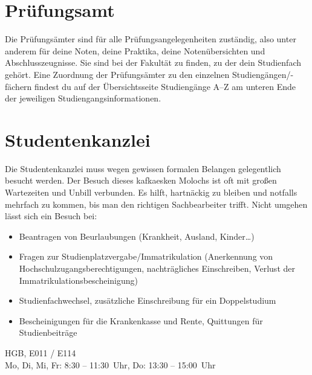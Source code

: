 \section{Prüfungsamt}
Die Prüfungsämter sind für alle Prüfungsangelegenheiten zuständig,
also unter anderem für deine Noten, deine Praktika, deine Notenübersichten und
Abschlusszeugnisse. Sie sind bei der Fakultät zu finden, zu der
dein Studienfach gehört. Eine Zuordnung der Prüfungsämter zu den
einzelnen Studiengängen/-fächern findest du auf der Übersichtsseite
Studiengänge A--Z am unteren Ende der jeweiligen
Studiengangsinformationen.

\begin{urlList}
\end{urlList}

\section{Studentenkanzlei}

Die Studentenkanzlei muss wegen gewissen formalen Belangen
gelegentlich besucht werden. Der Besuch dieses kafkaesken Molochs ist
oft mit großen Wartezeiten und Unbill verbunden. Es hilft, hartnäckig
zu bleiben und notfalls mehrfach zu kommen, bis man den richtigen
Sachbearbeiter trifft. Nicht umgehen lässt sich ein Besuch bei:

\begin{itemize}
\item Beantragen von Beurlaubungen (Krankheit, Ausland, Kinder\ldots)
\item Fragen zur Studienplatzvergabe/Immatrikulation (Anerkennung von Hochschulzugangsberechtigungen, nachträgliches Einschreiben, Verlust der Immatrikulationsbescheinigung)
\item Studienfachwechsel, zusätzliche Einschreibung für ein Doppelstudium
\item Bescheinigungen für die Krankenkasse und Rente, Quittungen für Studienbeiträge
\end{itemize}

HGB, E011 / E114\\
Mo, Di, Mi, Fr: 8:30 -- 11:30~Uhr, Do: 13:30 -- 15:00~Uhr\\
\begin{urlList}
\end{urlList}

%

